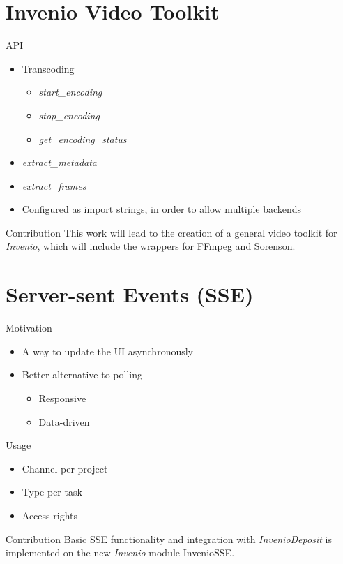 \documentclass{beamer}
\begin{document}
	\section{Invenio Video Toolkit}
  \begin{frame}{API}
    	\begin{itemize}
		  \item{Transcoding}
		  \begin{itemize}
		    \item{\emph{start_encoding}}
		    \item{\emph{stop_encoding}}
		    \item{\emph{get_encoding_status}}
    	  \end{itemize}
		  \item{\emph{extract_metadata}}
		  \item{\emph{extract_frames}}
		  \item{Configured as import strings, in order to allow \alert{multiple backends}}
	  \end{itemize}
	  \vfill
	  \begin{alertblock}{Contribution}
		  This work will lead to the creation of a general video toolkit for \emph{Invenio}, which will include the wrappers for \alert{FFmpeg} and \alert{Sorenson}.
    	\end{alertblock}
	\end{frame}

	\section{Server-sent Events (SSE)}
	\begin{frame}{Motivation}
	    	\begin{itemize}
    	  \item{A way to update the UI \alert{asynchronously}}
		  \item{Better alternative to polling}
    		\begin{itemize}
    		  \item{Responsive}
    		  \item{Data-driven}
	  	  \end{itemize}
	  \end{itemize}
	\end{frame}
	\begin{frame}{Usage}
    	\begin{itemize}
    		\item{Channel per project}
    		\item{Type per task}
    		\item{Access rights}
	  \end{itemize}
	  
	  \vfill
	  \begin{alertblock}{Contribution}
		  Basic SSE functionality and integration with \emph{InvenioDeposit} is implemented on the new \emph{Invenio} module \alert{InvenioSSE}.
    	\end{alertblock}
	\end{frame}
\end{document}
